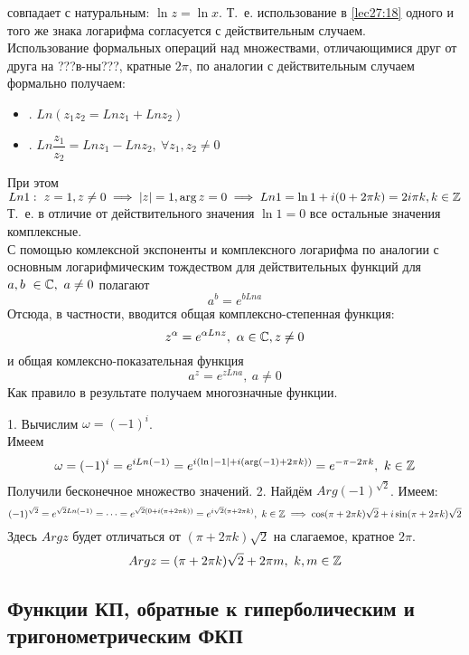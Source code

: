 \documentclass[../../main.tex]{subfiles}
\begin{document}
совпадает с натуральным: $ \ln z = \ln x $. Т.~е. использование в 
\eqref{lec27:18} одного и того же знака логарифма согласуется с действительным
случаем. \\
Использование формальных операций над множествами, отличающимися друг от друга
на ???в-ны???, кратные $ 2\pi $, по аналогии с действительным случаем формально
получаем:\\
\begin{itemize}
	\item. $Ln(z_1z_2 = Ln z_1 + Ln z_2)$
	\item. $Ln \dfrac{z_1}{z_2} = Ln z_1 - Ln z_2,\ \forall z_1, z_2 \neq 0$
\end{itemize}
При этом $ Ln 1:\ z = 1, z \neq 0 \implies |z| = 1, \arg z = 0 \implies 
Ln 1 = \ln 1 + i(0 + 2\pi k) = 2i\pi k, k\in\mathbb{Z}
$
Т.~е. в отличие от действительного значения $ \ln 1 = 0 $ все остальные 
значения комплексные.\\
С помощью комлексной экспоненты и комплексного логарифма по аналогии с основным
логарифмическим тождеством для действительных функций для 
$ a, b\ \in \mathbb{C},\ a \neq 0 $ полагают 
\begin{equation}
\label{lec27:20}
a^b = e^{b Ln a}
\end{equation}
Отсюда, в частности, вводится общая комплексно-степенная функция:
\begin{equation}
\label{lec27:21}
z^\alpha = e ^{\alpha Ln z},\ \alpha \in \mathbb{C}, z \neq 0
\end{equation}
и общая комлексно-показательная функция 
\begin{equation}
\label{lec27:22}
a^z = e^{z Ln a},\ a \neq 0
\end{equation}
Как правило в результате получаем многозначные функции.
\begin{exmps}
1. Вычислим $ \omega = (-1)^i $.\\
Имеем \[
\omega = (-1)^i = e^{i Ln(-1)} = 
e^{i(\ln |-1| + i(\arg(-1) + 2\pi k))} = 
e^{-\pi - 2\pi k},\ k \in \mathbb{Z}
\]
Получили бесконечное множество значений.
2. Найдём $ Arg(-1)^{\sqrt{2}} $. Имеем: \[
(-1)^{\sqrt{2}} = e^{\sqrt{2} Ln(-1)} = \dots =
e^{\sqrt{2}(0 + i(\pi + 2\pi k))} = 
e^{i\sqrt{2}(\pi + 2\pi k)},\ k \in \mathbb{Z} \implies
\cos (\pi + 2\pi k)\sqrt{2} + i\sin(\pi + 2\pi k)\sqrt{2}
\]
Здесь $ Arg z $ будет отличаться от $ (\pi + 2\pi k)\sqrt{2} $ на слагаемое, кратное $ 2\pi $.
\[
Arg z = (\pi + 2\pi k)\sqrt{2} + 2\pi m,\ k, m \in \Z
\]
\end{exmps}

\subsection{Функции КП, обратные к гиперболическим и тригонометрическим ФКП}
\end{document}

